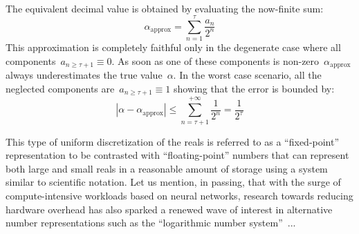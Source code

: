 \documentclass{article}
\begin{document}
{} \\

\noindent The equivalent decimal value is obtained by evaluating the now-finite sum:
\begin{equation*}
\alpha_\text{approx} = \sum_{n=1}^\tau \dfrac{a_n}{2^n}
\end{equation*}
This approximation is completely faithful only in the degenerate case where all components~$a_{n \geq \tau + 1} \equiv 0$. As soon as one of these components is non-zero~$\alpha_{\text{approx}}$ always underestimates the true value~$\alpha$.  In the worst case scenario, all the neglected components are~$a_{n \geq \tau + 1} \equiv 1$ showing that the error is bounded by:
\begin{equation*}
\left| \alpha - \alpha_\text{approx} \right| \leq \sum_{n=\tau+1}^{+\infty} \dfrac{1}{2^n} = \dfrac{1}{2^\tau}
\end{equation*}

\noindent This type of uniform discretization of the reals is referred to as a ``fixed-point'' representation to be contrasted with ``floating-point'' numbers that can represent both large and small reals in a reasonable amount of storage using a system similar to scientific notation.  Let us mention, in passing, that with the surge of compute-intensive workloads based on neural networks, research towards reducing hardware overhead has also sparked a renewed wave of interest in alternative number representations such as the ``logarithmic number system''~\cite{lns}...

\newpage
\end{document}
